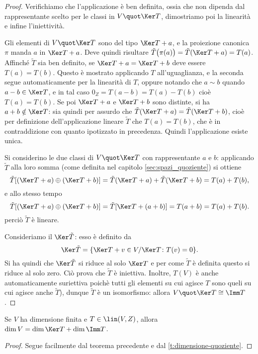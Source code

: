 \begin{proof}
	Verifichiamo che l'applicazione è ben definita, ossia che non dipenda dal rappresentante scelto per le classi in $V\quot\Ker T$, dimostriamo poi la linearità e infine l'iniettività.

	Gli elementi di $V\quot\Ker T$ sono del tipo $\Ker T+  a$, e la proiezione canonica $\pi$ manda $  a$ in $\Ker T+  a$.
	Deve quindi risultare $\tilde{T}\big(\pi(  a)\big)=\tilde{T}(\Ker T+  a)=T(  a)$.
	Affinché $\tilde{T}$ sia ben definito, se $\Ker T+  a=\Ker T+  b$ deve essere $T(  a)=T(  b)$.
	Questo è mostrato applicando $T$ all'uguaglianza, e la seconda segue automaticamente per la linearità di $T$, oppure notando che $  a\sim  b$ quando $  a-  b\in\Ker T$, e in tal caso $0_Z=T(  a-  b)=T(  a)-T(  b)$ cioè $T(  a)=T(  b)$.
	Se poi $\Ker T+  a$ e $\Ker T+  b$ sono distinte, si ha $  a+  b\notin\Ker T$: sia quindi per assurdo che $\tilde{T}(\Ker T+  a)=\tilde{T}(\Ker T+  b)$, cioè per definizione dell'applicazione lineare $\tilde{T}$ che $T(  a)=T(  b)$, che è in contraddizione con quanto ipotizzato in precedenza.
	Quindi l'applicazione esiste unica.

	Si considerino le due classi di $V\quot\Ker T$ con rappresentante $  a$ e $  b$: applicando $\tilde{T}$ alla loro somma (come definita nel capitolo \ref{sec:spazi_quoziente}) si ottiene
	\begin{equation}
		\tilde{T}[(\Ker T+  a)\oplus(\Ker T+  b)]=\tilde{T}(\Ker T+  a)+\tilde{T}(\Ker T+  b)=T(  a)+T(  b),
	\end{equation}
	e allo stesso tempo
	\begin{equation}
		\tilde{T}[(\Ker T+  a)\oplus(\Ker T+  b)]=\tilde{T}[\Ker T+(  a+  b)]=T(  a+  b)=T(  a)+T(  b).
	\end{equation}
	perciò $\tilde T$ è lineare.

	Consideriamo il $\Ker \tilde{T}$: esso è definito da
	\begin{equation*}
		\Ker \tilde{T} = \{\Ker T +  v\in V/\Ker T\colon T(  v) = 0 \}.
	\end{equation*}
	Si ha quindi che $\Ker \tilde{T}$ si riduce al solo $\Ker T$ e per come $\tilde{T}$ è definita questo si riduce al solo zero.
	Ciò prova che $\tilde{T}$ è iniettiva.
	Inoltre, $T(V)$ è anche automaticamente suriettiva poichè tutti gli elementi su cui agisce $T$ sono queli su cui agisce anche $\tilde{T}$), dunque $\tilde{T}$ è un isomorfismo: allora $V\quot\Ker T\cong\Imm T$.
\end{proof}
\begin{corollario}
	Se $V$ ha dimensione finita e $T\in\lin(V,Z)$, allora $\dim V=\dim\Ker T+\dim\Imm T$.
\end{corollario}
\begin{proof}
	Segue facilmente dal teorema precedente e dal \ref{t:dimensione-quoziente}.
\end{proof}


